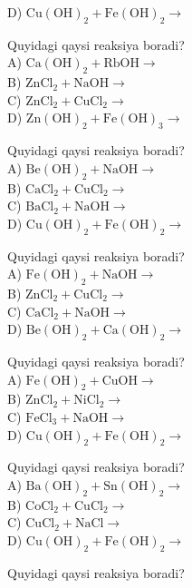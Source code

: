 D) $\mathrm{Cu}(\mathrm{OH})_{2}+\mathrm{Fe}(\mathrm{OH})_{2} \rightarrow$
  \item Quyidagi qaysi reaksiya boradi?\\
A) $\mathrm{Ca}(\mathrm{OH})_{2}+\mathrm{RbOH} \rightarrow$\\
B) $\mathrm{ZnCl}_{2}+\mathrm{NaOH} \rightarrow$\\
C) $\mathrm{ZnCl}_{2}+\mathrm{CuCl}_{2} \rightarrow$\\
D) $\mathrm{Zn}(\mathrm{OH})_{2}+\mathrm{Fe}(\mathrm{OH})_{3} \rightarrow$
  \item Quyidagi qaysi reaksiya boradi?\\
A) $\mathrm{Be}(\mathrm{OH})_{2}+\mathrm{NaOH} \rightarrow$\\
B) $\mathrm{CaCl}_{2}+\mathrm{CuCl}_{2} \rightarrow$\\
C) $\mathrm{BaCl}_{2}+\mathrm{NaOH} \rightarrow$\\
D) $\mathrm{Cu}(\mathrm{OH})_{2}+\mathrm{Fe}(\mathrm{OH})_{2} \rightarrow$
  \item Quyidagi qaysi reaksiya boradi?\\
A) $\mathrm{Fe}(\mathrm{OH})_{2}+\mathrm{NaOH} \rightarrow$\\
B) $\mathrm{ZnCl}_{2}+\mathrm{CuCl}_{2} \rightarrow$\\
C) $\mathrm{CaCl}_{2}+\mathrm{NaOH} \rightarrow$\\
D) $\mathrm{Be}(\mathrm{OH})_{2}+\mathrm{Ca}(\mathrm{OH})_{2} \rightarrow$
  \item Quyidagi qaysi reaksiya boradi?\\
A) $\mathrm{Fe}(\mathrm{OH})_{2}+\mathrm{CuOH} \rightarrow$\\
B) $\mathrm{ZnCl}_{2}+\mathrm{NiCl}_{2} \rightarrow$\\
C) $\mathrm{FeCl}_{3}+\mathrm{NaOH} \rightarrow$\\
D) $\mathrm{Cu}(\mathrm{OH})_{2}+\mathrm{Fe}(\mathrm{OH})_{2} \rightarrow$
  \item Quyidagi qaysi reaksiya boradi?\\
A) $\mathrm{Ba}(\mathrm{OH})_{2}+\mathrm{Sn}(\mathrm{OH})_{2} \rightarrow$\\
B) $\mathrm{CoCl}_{2}+\mathrm{CuCl}_{2} \rightarrow$\\
C) $\mathrm{CuCl}_{2}+\mathrm{NaCl} \rightarrow$\\
D) $\mathrm{Cu}(\mathrm{OH})_{2}+\mathrm{Fe}(\mathrm{OH})_{2} \rightarrow$
  \item Quyidagi qaysi reaksiya boradi?\\

